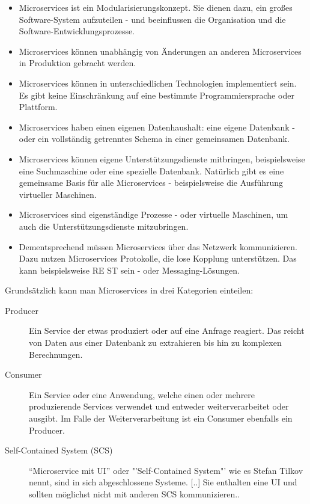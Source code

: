 \begin{itemize}
    \item Microservices ist ein Modularisierungskonzept. Sie dienen dazu, ein großes Software-System aufzuteilen - und beeinflussen die Organisation und die Software-Entwicklungsprozesse.
    \item Microservices können unabhängig von Änderungen an anderen Microservices in Produktion gebracht werden.
    \item Microservices können in unterschiedlichen Technologien implementiert sein. Es gibt keine Einschränkung auf eine bestimmte Programmiersprache oder Plattform.
    \item Microservices haben einen eigenen Datenhaushalt: eine eigene Datenbank - oder ein vollständig getrenntes Schema in einer gemeinsamen Datenbank.
    \item Microservices können eigene Unterstützungsdienste mitbringen, beispielsweise eine Suchmaschine oder eine spezielle Datenbank. Natürlich gibt es eine gemeinsame Basis für alle Microservices - beispielsweise die Ausführung virtueller Maschinen.
    \item Microservices sind eigenständige Prozesse - oder virtuelle Maschinen, um auch die Unterstützungsdienste mitzubringen.
    \item Dementsprechend müssen Microservices über das Netzwerk kommunizieren. Dazu nutzen Microservices Protokolle, die lose Kopplung unterstützen. Das kann beispielsweise RE
    ST sein - oder Messaging-Lösungen.
\end{itemize}

Grundsätzlich kann man Microservices in drei Kategorien einteilen:
\begin{description}
    \item[Producer] Ein Service der etwas produziert oder auf eine Anfrage reagiert. Das reicht von Daten aus einer Datenbank zu extrahieren bis hin zu komplexen Berechnungen.
    \item[Consumer] Ein Service oder eine Anwendung, welche einen oder mehrere produzierende Services verwendet und entweder weiterverarbeitet oder ausgibt. Im Falle der Weiterverarbeitung ist ein Consumer ebenfalls ein Producer.
    \item[Self-Contained System (SCS)] \frqq "`Microservice mit UI"' oder "'Self-Contained System"' wie es Stefan Tilkov nennt, sind in sich abgeschlossene Systeme. [..] Sie enthalten eine UI und sollten möglichst nicht mit anderen SCS kommunizieren.\flqq \cite[vgl S. 55]{EWolff2016:Microservices}.
\end{description}

